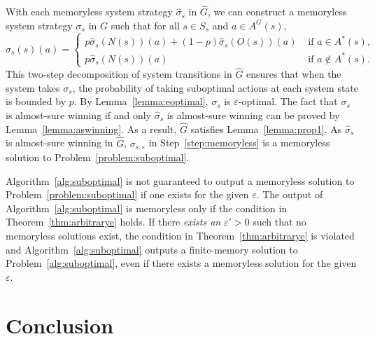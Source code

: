 \documentclass[runningheads,a4paper]{llncs}
\begin{document}
With each memoryless system strategy $\hat{\sigma}_s$ in $\hat{G}$, we can construct a memoryless system strategy $\sigma_s$ in $G$ such that for all $s \in S_s$ and $a \in A^G(s)$, 
\begin{equation}
\sigma_s(s)(a) = 
\begin{cases}
p \hat{\sigma}_s(N(s))(a) + (1-p)\hat{\sigma}_s(O(s))(a) &\text{ if }a \in A^*(s), \\
p \hat{\sigma}_s(N(s))(a) &\text{ if }a \not\in A^*(s). 
\end{cases}
\label{eq:construct1}
\end{equation}
This two-step decomposition of system transitions in $\hat{G}$ ensures that when the system takes $\sigma_s$, the probability of taking suboptimal actions at each system state is bounded by $p$.  
By Lemma~\ref{lemma:eoptimal}, $\sigma_s$ is $\varepsilon$-optimal. The fact that $\sigma_s$ is almost-sure winning if and only $\hat{\sigma}_s$ is almost-sure winning can be proved by Lemma~\ref{lemma:aswinning}. As a result, $\hat{G}$ satisfies Lemma~\ref{lemma:prop1}. As $\hat{\sigma}_s$ is almost-sure winning in $\hat{G}$, $\sigma_{s,\varepsilon}$ in Step~\ref{step:memoryless} is a memoryless solution to Problem~\ref{problem:suboptimal}. 














\begin{remark}
Algorithm~\ref{alg:suboptimal} is not guaranteed to output a memoryless solution to Problem~\ref{problem:suboptimal} if one exists for the given $\varepsilon$. The output of Algorithm~\ref{alg:suboptimal} is memoryless only if the condition in Theorem~\ref{thm:arbitrarye} holds. If there \emph{exists an} $\varepsilon'>0$ such that no memoryless solutions exist, the condition in Theorem~\ref{thm:arbitrarye} is violated and Algorithm~\ref{alg:suboptimal} outputs a finite-memory solution to Problem~\ref{alg:suboptimal}, even if there exists a memoryless solution for the given $\varepsilon$.
\end{remark}










\section{Conclusion}
\end{document}
